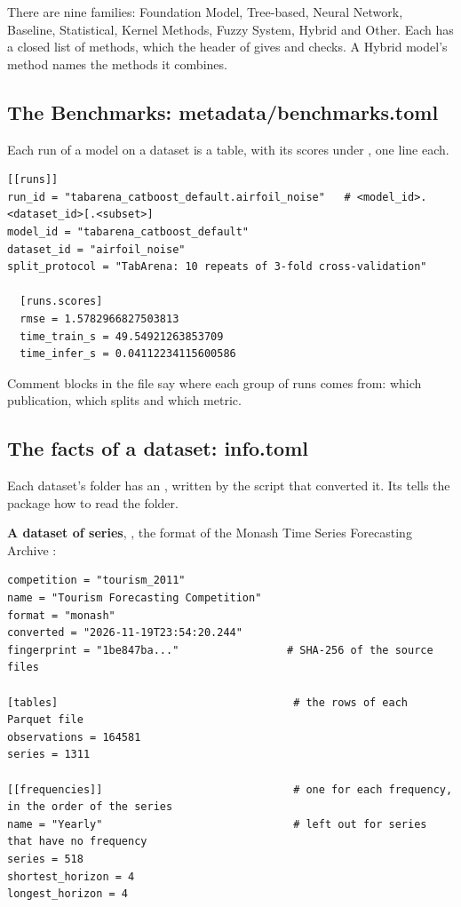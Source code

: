 There are nine families: Foundation Model, Tree-based, Neural Network, Baseline, Statistical, Kernel Methods, Fuzzy
System, Hybrid and Other. Each has a closed list of methods, which the header of  gives and
 checks. A Hybrid model's method names the methods it combines.

\subsection{The Benchmarks: metadata/benchmarks.toml}

Each run of a model on a dataset is a \file{[[runs]]} table, with its scores under , one
 line each.

\begin{lstlisting}
[[runs]]
run_id = "tabarena_catboost_default.airfoil_noise"   # <model_id>.<dataset_id>[.<subset>]
model_id = "tabarena_catboost_default"
dataset_id = "airfoil_noise"
split_protocol = "TabArena: 10 repeats of 3-fold cross-validation"

  [runs.scores]
  rmse = 1.5782966827503813
  time_train_s = 49.54921263853709
  time_infer_s = 0.04112234115600586
\end{lstlisting}

Comment blocks in the file say where each group of runs comes from: which publication, which splits and which metric.

\subsection{The facts of a dataset: info.toml}

Each dataset's folder has an , written by the script that converted it. Its  tells the
package how to read the folder.

\textbf{A dataset of series}, , the format of the Monash Time Series Forecasting Archive
:

\begin{lstlisting}
competition = "tourism_2011"
name = "Tourism Forecasting Competition"
format = "monash"
converted = "2026-11-19T23:54:20.244"
fingerprint = "1be847ba..."                 # SHA-256 of the source files

[tables]                                     # the rows of each Parquet file
observations = 164581
series = 1311

[[frequencies]]                              # one for each frequency, in the order of the series
name = "Yearly"                              # left out for series that have no frequency
series = 518
shortest_horizon = 4
longest_horizon = 4
\end{lstlisting}

